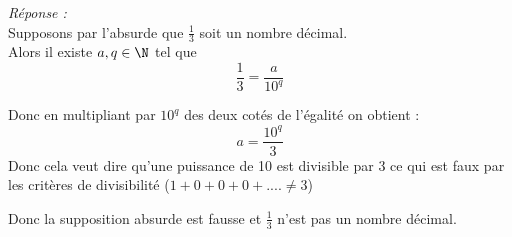 \textit{Réponse : }\\

Supposons par l'absurde que $\frac{1}{3}$ soit un nombre décimal. \\
Alors il existe $a,q\in \N $ tel que \[\frac{1}{3} = \frac{a}{10^q}\]

Donc en multipliant par $10^q$ des deux cotés de l'égalité on obtient :\[
a = \frac{10^q}{3}
\]
Donc cela veut dire qu'une puissance de 10 est divisible par 3 ce qui est faux par les critères de divisibilité ($1 + 0 + 0 + 0 + .... \neq 3$)

Donc la supposition absurde est fausse et $\frac{1}{3}$ n'est pas un nombre décimal.